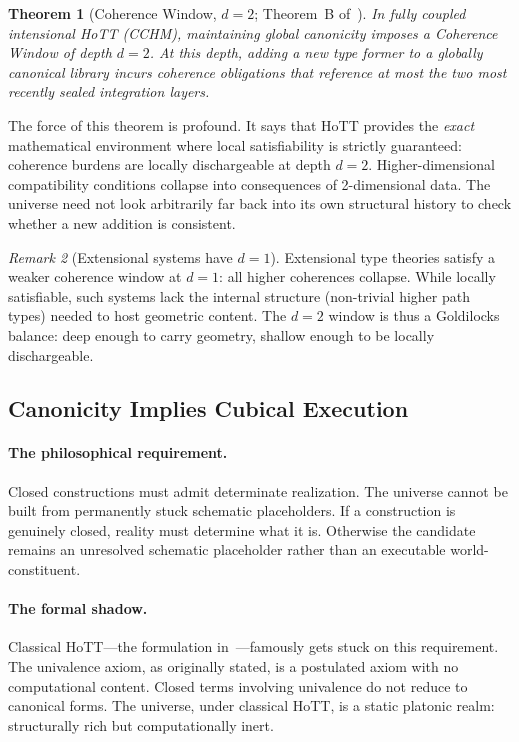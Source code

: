 \documentclass[11pt,a4paper]{article}
\theoremstyle{plain}
\newtheorem{theorem}{Theorem}[section]
\theoremstyle{definition}
\theoremstyle{remark}
\newtheorem{remark}[theorem]{Remark}
\begin{document}
\begin{theorem}[Coherence Window, $d = 2$; Theorem~B of~\cite{pen2026}]
\label{thm:coherence-window}
In fully coupled intensional HoTT (CCHM), maintaining global canonicity imposes a Coherence Window of depth $d = 2$.  At this depth, adding a new type former to a globally canonical library incurs coherence obligations that reference at most the two most recently sealed integration layers.
\end{theorem}

The force of this theorem is profound.  It says that HoTT provides the \emph{exact} mathematical environment where local satisfiability is strictly guaranteed: coherence burdens are locally dischargeable at depth $d = 2$.  Higher-dimensional compatibility conditions collapse into consequences of 2-dimensional data.  The universe need not look arbitrarily far back into its own structural history to check whether a new addition is consistent.

\begin{remark}[Extensional systems have $d = 1$]
Extensional type theories satisfy a weaker coherence window at $d = 1$: all higher coherences collapse.  While locally satisfiable, such systems lack the internal structure (non-trivial higher path types) needed to host geometric content.  The $d = 2$ window is thus a Goldilocks balance: deep enough to carry geometry, shallow enough to be locally dischargeable.
\end{remark}


\subsection{Canonicity Implies Cubical Execution}
\label{sec:canonicity}

\paragraph{The philosophical requirement.}
Closed constructions must admit determinate realization.  The universe cannot be built from permanently stuck schematic placeholders.  If a construction is genuinely closed, reality must determine what it is.  Otherwise the candidate remains an unresolved schematic placeholder rather than an executable world-constituent.

\paragraph{The formal shadow.}
Classical HoTT---the formulation in~\cite{hottbook}---famously gets stuck on this requirement.  The univalence axiom, as originally stated, is a postulated axiom with no computational content.  Closed terms involving univalence do not reduce to canonical forms.  The universe, under classical HoTT, is a static platonic realm: structurally rich but computationally inert.
\end{document}

